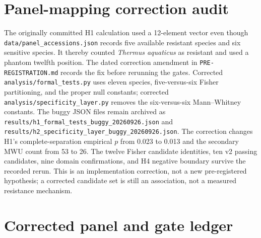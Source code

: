 \section{Panel-mapping correction audit}
The originally committed H1 calculation used a 12-element vector even though \texttt{data/panel\_accessions.json} records five available resistant species and six sensitive species. It thereby counted \emph{Thermus aquaticus} as resistant and used a phantom twelfth position. The dated correction amendment in \texttt{PRE-REGISTRATION.md} records the fix before rerunning the gates. Corrected \texttt{analysis/formal\_tests.py} uses eleven species, five-versus-six Fisher partitioning, and the proper null constants; corrected \texttt{analysis/specificity\_layer.py} removes the six-versus-six Mann--Whitney constants. The buggy JSON files remain archived as \texttt{results/h1\_formal\_tests\_buggy\_20260926.json} and \texttt{results/h2\_specificity\_layer\_buggy\_20260926.json}. The correction changes H1's complete-separation empirical $p$ from 0.023 to 0.013 and the secondary MWU count from 53 to 26. The twelve Fisher candidate identities, ten v2 passing candidates, nine domain confirmations, and H4 negative boundary survive the recorded rerun. This is an implementation correction, not a new pre-registered hypothesis; a corrected candidate set is still an association, not a measured resistance mechanism.

\section{Corrected panel and gate ledger}
